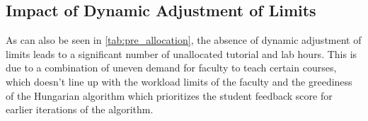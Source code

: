 \subsection{Impact of Dynamic Adjustment of Limits}

As can also be seen in \autoref{tab:pre_allocation}, the absence of dynamic adjustment of limits leads to a significant number of unallocated tutorial and lab hours. This is due to a combination of uneven demand for faculty to teach certain courses, which doesn't line up with the workload limits of the faculty and the greediness of the Hungarian algorithm which prioritizes the student feedback score for earlier iterations of the algorithm.

\begin{table}[H]
  \centering
  \caption{Impact of Dynamic Adjustment of Limits on Tutorials}
  \label{tab:dynamic_adjustment_tutorials}
\end{table}

